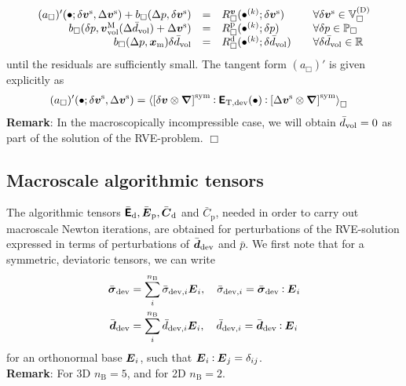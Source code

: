 \documentclass[10pt,a4paper]{article}
\newcommand{\ded}{\mathrm{d}}
\newcommand{\dep}{\mathrm{p}}
\begin{document}
\begin{equation}
\begin{array}{rcll}
    (a_\Box)'(\bullet; \delta\ta{v}^\fluct,\Delta \ta{v}^\fluct)
    + b_\Box(\Delta p,\delta\ta{v}^\fluct)
    & = &
    R_\Box^{\ta v}(\bullet^{(k)}; \delta\ta{v}^\fluct)
    \quad & \forall \delta \ta{v}^\fluct\in\set{V}_\Box^{(\Dirichlet)}
    \\
    b_\Box(\delta p,\ta{v}^\macro_\vol(\Delta\bar{d}_\vol) + \Delta\ta{v}^\fluct)
    & = &
    R_\Box^\dep(\bullet^{(k)}; \delta p)
    \quad & \forall \delta p\in\set{P}_\Box
    \\
    b_\Box(\Delta p,\ta{x}_\mean)\delta\bar{d}_\vol
    & = &
    R_\Box^\ded(\bullet^{(k)}; \delta\bar{d}_\vol)
    \quad & \forall \delta\bar{d}_\vol  \in \set{R}
\end{array}
\label{eq252b}
\end{equation}
until the residuals are sufficiently small. The tangent form $(a_\Box)'$
is given explicitly as
\begin{align}
    (a_\Box)'(\bullet; \delta \boldsymbol{v}^{\mathrm{s}},\Delta{\boldsymbol{v}}^{\mathrm{s}})
    & = 
    \left\langle \left[\delta\boldsymbol{v}\mathbin{\otimes}\boldsymbol{\nabla}\right]^{\mathrm{sym}} \mathbin{\vcentcolon} \boldsymbol{\mathsf{E}}_{\mathrm{T},\mathrm{dev}}(\bullet) \mathbin{\vcentcolon}
    \left[\Delta\boldsymbol{v}^{\mathrm{s}}\mathbin{\otimes}\boldsymbol{\nabla}\right]^{\mathrm{sym}} \right\rangle_\Box
\end{align}
\textbf{Remark}: In the macroscopically incompressible case, we will obtain $\bar{d}_{\mathrm{vol}}=0$ as part of the solution of the RVE-problem. $\Box$

\subsection{Macroscale algorithmic tensors}

The algorithmic tensors $\bar{\tf{E}}_\ded, \bar{\ts E }_\dep, \bar{\ts C}_\ded$ and $\bar{C}_\dep$, needed in order to carry out macroscale Newton iterations, are obtained for
perturbations of the RVE-solution expressed in terms of perturbations of $\bar{\boldsymbol{d}}_{\mathrm{dev}}$ and $\bar{p}$.
We first note that for a symmetric, deviatoric tensors, we can write
\begin{align}
 \bar{\boldsymbol{\sigma}}_{\mathrm{dev}} &= \sum_i^{n_{\mathrm{B}}} \bar{\sigma}_{\mathrm{dev},i} \boldsymbol{E}_i,\quad \bar{\sigma}_{\mathrm{dev},i} = \bar{\boldsymbol{\sigma}}_{\mathrm{dev}}\mathbin{\vcentcolon} \boldsymbol{E}_i\\
 \bar{\boldsymbol{d}}_{\mathrm{dev}} &= \sum_i^{n_{\mathrm{B}}} \bar{d}_{\mathrm{dev},i} \boldsymbol{E}_i,\quad  \bar{d}_{\mathrm{dev},i} = \bar{\boldsymbol{d}}_{\mathrm{dev}}\mathbin{\vcentcolon} \boldsymbol{E}_i
\end{align}
for an orthonormal base $\boldsymbol{E}_i$, such that $\boldsymbol{E}_i \mathbin{\vcentcolon} \boldsymbol{E}_j = \delta_{ij} $.\\
\textbf{Remark}: For 3D $n_{\mathrm{B}} = 5$, and for 2D $n_{\mathrm{B}} = 2$.
\end{document}
